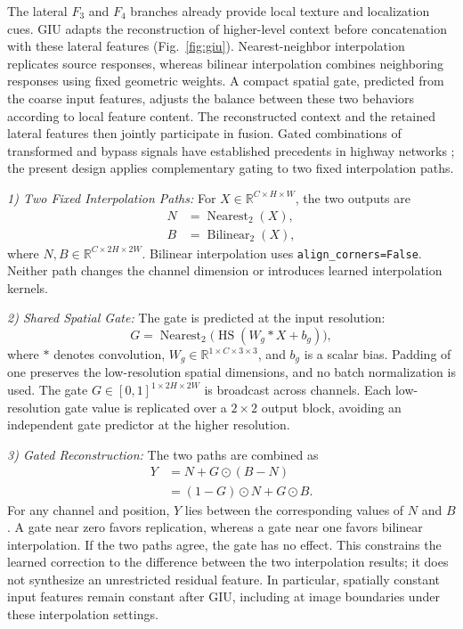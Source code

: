 \documentclass[journal]{IEEEtran}
\begin{document}
The lateral $F_3$ and $F_4$ branches already provide local texture and localization cues. GIU adapts the reconstruction of higher-level context before concatenation with these lateral features (Fig.~\ref{fig:giu}). Nearest-neighbor interpolation replicates source responses, whereas bilinear interpolation combines neighboring responses using fixed geometric weights. A compact spatial gate, predicted from the coarse input features, adjusts the balance between these two behaviors according to local feature content. The reconstructed context and the retained lateral features then jointly participate in fusion. Gated combinations of transformed and bypass signals have established precedents in highway networks \cite{srivastava2015highway}; the present design applies complementary gating to two fixed interpolation paths.

\emph{1) Two Fixed Interpolation Paths:}
For $X\in\mathbb{R}^{C\times H\times W}$, the two outputs are
\begin{align}
N &= \operatorname{Nearest}_{2}(X), \label{eq:giu-nearest}\\
B &= \operatorname{Bilinear}_{2}(X), \label{eq:giu-bilinear}
\end{align}
where $N,B\in\mathbb{R}^{C\times2H\times2W}$. Bilinear interpolation uses \texttt{align\_corners=False}. Neither path changes the channel dimension or introduces learned interpolation kernels.

\emph{2) Shared Spatial Gate:}
The gate is predicted at the input resolution:
\begin{equation}
G=\operatorname{Nearest}_{2}\bigl(\operatorname{HS}(W_g*X+b_g)\bigr),
\label{eq:giu-gate}
\end{equation}
where $*$ denotes convolution, $W_g\in\mathbb{R}^{1\times C\times3\times3}$, and $b_g$ is a scalar bias. Padding of one preserves the low-resolution spatial dimensions, and no batch normalization is used. The gate $G\in[0,1]^{1\times2H\times2W}$ is broadcast across channels. Each low-resolution gate value is replicated over a $2\times2$ output block, avoiding an independent gate predictor at the higher resolution.

\emph{3) Gated Reconstruction:}
The two paths are combined as
\begin{align}
Y &= N+G\odot(B-N) \label{eq:giu-residual}\\
  &= (1-G)\odot N+G\odot B. \label{eq:giu-mixture}
\end{align}
For any channel and position, $Y$ lies between the corresponding values of $N$ and $B$. A gate near zero favors replication, whereas a gate near one favors bilinear interpolation. If the two paths agree, the gate has no effect. This constrains the learned correction to the difference between the two interpolation results; it does not synthesize an unrestricted residual feature. In particular, spatially constant input features remain constant after GIU, including at image boundaries under these interpolation settings.
\end{document}
